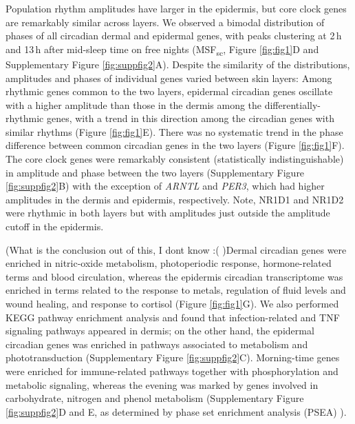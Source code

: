 Population rhythm amplitudes have larger in the epidermis, but core clock genes are remarkably similar across layers. We observed a bimodal distribution of phases of all circadian dermal and epidermal genes, with peaks clustering at 2\,h and 13\,h after mid-sleep time on free nights (MSF\textsubscript{sc}, Figure \ref{fig:fig1}D and Supplementary Figure \ref{fig:suppfig2}A). Despite the similarity of the distributions, amplitudes and phases of individual genes varied between skin layers: Among rhythmic genes common to the two layers,  epidermal circadian genes oscillate with a higher amplitude than those in the dermis among the differentially-rhythmic genes, with a trend in this direction among the circadian genes with similar rhythms (Figure \ref{fig:fig1}E). There was no systematic trend in the phase difference between common circadian genes in the two layers (Figure \ref{fig:fig1}F). The core clock genes were remarkably consistent (statistically indistinguishable) in amplitude and phase between the two layers (Supplementary Figure \ref{fig:suppfig2}B) with the exception of \textit{ARNTL} and \textit{PER3}, which had higher amplitudes in the dermis and epidermis, respectively. Note, NR1D1 and NR1D2 were rhythmic in both layers but with amplitudes just outside the amplitude cutoff in the epidermis.

(What is the conclusion out of this, I dont know :( )Dermal circadian genes were enriched in nitric-oxide metabolism, photoperiodic response, hormone-related terms and blood circulation, whereas the epidermis circadian transcriptome was enriched in terms related to the response to metals, regulation of fluid levels and wound healing, and response to cortisol (Figure \ref{fig:fig1}G). We also performed KEGG pathway enrichment analysis and found that infection-related and TNF signaling pathways appeared in dermis; on the other hand, the epidermal circadian genes was enriched in pathways associated to metabolism and phototransduction (Supplementary Figure \ref{fig:suppfig2}C). Morning-time genes were enriched for immune-related pathways together with phosphorylation and metabolic signaling, whereas the evening was marked by genes involved in carbohydrate, nitrogen and phenol metabolism (Supplementary Figure \ref{fig:suppfig2}D and E, as determined by phase set enrichment analysis (PSEA) \cite{Zhang2016}). 

